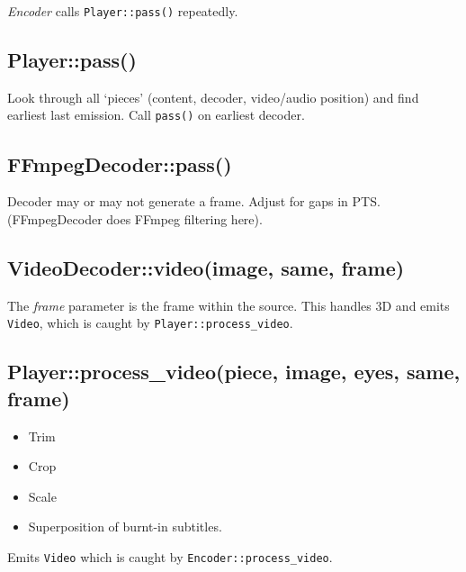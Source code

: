 \documentclass{article}
\author{}
\date{}
\begin{document}
\maketitle

\emph{Encoder} calls \texttt{Player::pass()} repeatedly.

\subsection*{Player::pass()}

Look through all `pieces' (content, decoder, video/audio position) and
find earliest last emission.  Call \texttt{pass()} on earliest
decoder.

\subsection*{FFmpegDecoder::pass()}

Decoder may or may not generate a frame.  Adjust for gaps in PTS.
(FFmpegDecoder does FFmpeg filtering here).

\subsection*{VideoDecoder::video(image, same, frame)}

The \emph{frame} parameter is the frame within the source.  This
handles 3D and emits \texttt{Video}, which is caught by
\texttt{Player::process\_video}.

\subsection*{Player::process\_video(piece, image, eyes, same, frame)}

\begin{itemize}
\item Trim
\item Crop
\item Scale
\item Superposition of burnt-in subtitles.
\end{itemize}

Emits \texttt{Video} which is caught by \texttt{Encoder::process\_video}.
\end{document}

